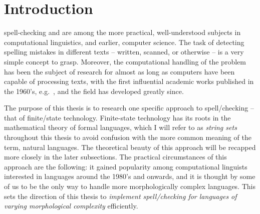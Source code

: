 \documentclass[officiallayout,final]{unihelcompling}
\begin{document}



\printglossaries

\chapter{Introduction}
\label{chap:introduction}

\Gls{spell-checking} and  are among
the more practical, well-understood subjects in \gls{computational
linguistics}, and earlier, computer science.  The task of detecting spelling
mistakes in different texts -- written, scanned, or otherwise -- is a very
simple concept to grasp. Moreover, the computational handling of the problem
has been the subject of research for almost as long as computers have been
capable of processing texts, with the first influential academic works
published in the 1960's, e.g.~\cite{damerau1964technique}, and the field has
developed greatly since.

The purpose of this thesis is to research one specific approach to
spell\-/checking -- that of finite\-/state technology. Finite-state technology
has its roots in the mathematical theory of \glspl{formal language}, which I
will refer to as \emph{string sets} throughout this thesis to avoid confusion
with the more common meaning of the term, \glspl{natural language}. The
theoretical beauty of this approach will be recapped more closely in the later
subsections.  The practical circumstances of this approach are the following:
it gained popularity among computational linguists interested in
 languages around
the 1980's and onwards, and it is thought by some of us to be the only way to
handle more morphologically complex languages. This sets the direction of this
thesis to \emph{implement spell\-/checking for languages of varying
morphological complexity} efficiently.
\end{document}
